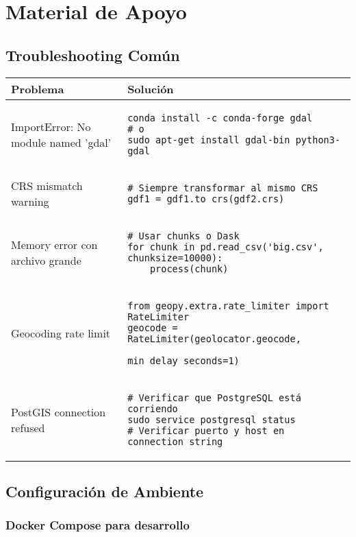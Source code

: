 \documentclass[11pt,a4paper]{article}
\begin{document}
\section{Material de Apoyo}

\subsection{Troubleshooting Común}

\begin{table}[H]
\centering
\begin{tabular}{|p{5cm}|p{10cm}|}
\hline
\textbf{Problema} & \textbf{Solución} \\
\hline
ImportError: No module named 'gdal' & 
\begin{verbatim}
conda install -c conda-forge gdal
# o
sudo apt-get install gdal-bin python3-gdal
\end{verbatim} \\
\hline
CRS mismatch warning & 
\begin{verbatim}
# Siempre transformar al mismo CRS
gdf1 = gdf1.to_crs(gdf2.crs)
\end{verbatim} \\
\hline
Memory error con archivo grande & 
\begin{verbatim}
# Usar chunks o Dask
for chunk in pd.read_csv('big.csv', chunksize=10000):
    process(chunk)
\end{verbatim} \\
\hline
Geocoding rate limit & 
\begin{verbatim}
from geopy.extra.rate_limiter import RateLimiter
geocode = RateLimiter(geolocator.geocode, 
                      min_delay_seconds=1)
\end{verbatim} \\
\hline
PostGIS connection refused & 
\begin{verbatim}
# Verificar que PostgreSQL está corriendo
sudo service postgresql status
# Verificar puerto y host en connection string
\end{verbatim} \\
\hline
\end{tabular}
\end{table}

\subsection{Configuración de Ambiente}

\subsubsection{Docker Compose para desarrollo}
\end{document}
